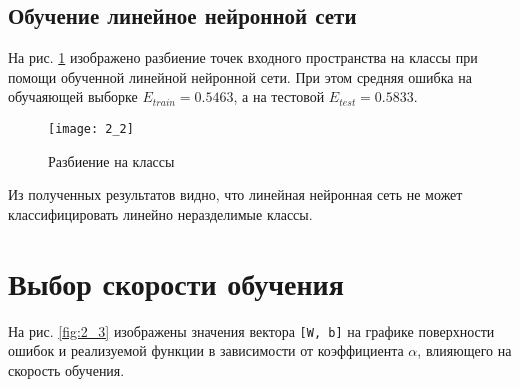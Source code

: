\newpage

\subsection{Обучение линейное нейронной сети}

На рис. \ref{fig:2_2} изображено разбиение точек входного пространства на классы при помощи обученной линейной нейронной сети. При этом средняя ошибка на обучаяющей выборке $E_{train} = 0.5463$, а на тестовой $E_{test} = 0.5833$.
\begin{figure}[H]
\begin{center}
	\texttt{[image: 2\_2]}
	\caption{Разбиение на классы}
	\label{fig:2_2}
\end{center}
\end{figure}

Из полученных результатов видно, что линейная нейронная сеть не может классифицировать линейно неразделимые классы.

\section{Выбор скорости обучения}


На рис. \ref{fig:2_3} изображены значения вектора \verb+[W, b]+ на графике поверхности ошибок и реализуемой функции в зависимости от коэффициента $\alpha$, влияющего на скорость обучения.

